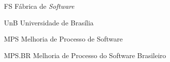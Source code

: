 \begin{siglas}
  \item[FS] Fábrica de \textit{Software}
  \item[UnB] Universidade de Brasília
  \item[MPS] Melhoria de Processo de Software
  \item[MPS.BR] Melhoria de Processo do Software Brasileiro 
\end{siglas}
